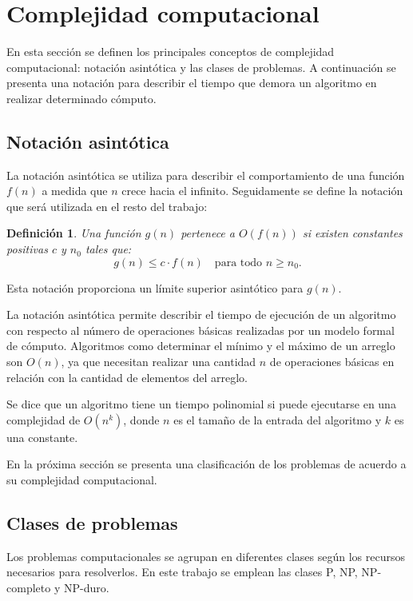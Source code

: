 \documentclass[12pt]{article}
\newtheorem{definition}{Definición}
\begin{document}
\section{Complejidad computacional}

En esta sección se definen los principales conceptos de complejidad computacional: notación asintótica y las clases de problemas. A continuación se presenta una notación para describir el tiempo que demora un algoritmo en realizar determinado cómputo.

\subsection{Notación asintótica}

La notación asintótica se utiliza para describir el comportamiento de una función $f(n)$ a medida que $n$ crece hacia el infinito.  Seguidamente se define la notación que será utilizada en el resto del trabajo:

\begin{definition}
  Una función $g(n)$ pertenece a $O(f(n))$ si existen constantes positivas $c$ y $n_0$ tales que:
  \[
    g(n) \leq c \cdot f(n) \quad \text{para todo } n \geq n_0.
  \]
\end{definition}

Esta notación proporciona un límite superior asintótico para $g(n)$.

La notación asintótica permite describir el tiempo de ejecución de un algoritmo con respecto al número de 
operaciones básicas realizadas por un modelo formal de cómputo.  Algoritmos como determinar el mínimo y el 
máximo de un arreglo son $O(n)$, ya que necesitan realizar una cantidad $n$ de operaciones básicas en relación 
con la cantidad de elementos del arreglo.

Se dice que un algoritmo tiene un tiempo polinomial si puede ejecutarse en una complejidad de $O(n^k)$, donde $n$ es el tamaño de la entrada del algoritmo y $k$
es una constante. 

En la próxima sección se presenta una clasificación de los problemas de acuerdo a su complejidad computacional.
\subsection{Clases de problemas}

Los problemas computacionales \cite{authomataTheory} se agrupan en diferentes clases según los recursos 
necesarios para resolverlos. En este trabajo se emplean las clases P, NP, NP-completo y NP-duro.
\end{document}
